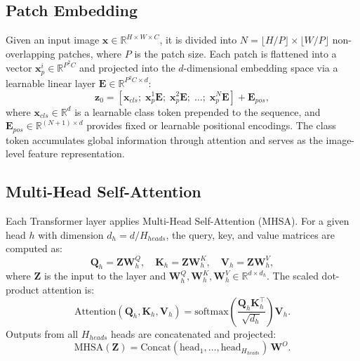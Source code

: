 \documentclass[journal]{IEEEtran}
\begin{document}
\subsection{Patch Embedding}
Given an input image $\mathbf{x} \in \mathbb{R}^{H \times W \times C}$, it is divided into
$N = \lfloor H/P \rfloor \times \lfloor W/P \rfloor$ non-overlapping patches, where $P$ is
the patch size. Each patch is flattened into a vector $\mathbf{x}_p^i \in \mathbb{R}^{P^2 C}$
and projected into the $d$-dimensional embedding space via a learnable linear layer
$\mathbf{E} \in \mathbb{R}^{P^2C \times d}$:
\begin{equation}
    \mathbf{z}_0 = [\mathbf{x}_{cls};\; \mathbf{x}_p^1\mathbf{E};\; \mathbf{x}_p^2\mathbf{E};\;
    \ldots;\; \mathbf{x}_p^N\mathbf{E}] + \mathbf{E}_{pos},
    \label{eq:patch_embed}
\end{equation}
where $\mathbf{x}_{cls} \in \mathbb{R}^d$ is a learnable class token prepended to the sequence,
and $\mathbf{E}_{pos} \in \mathbb{R}^{(N+1) \times d}$ provides fixed or learnable positional
encodings. The class token accumulates global information through attention and serves as the
image-level feature representation.

\subsection{Multi-Head Self-Attention}
Each Transformer layer applies Multi-Head Self-Attention (MHSA). For a given head $h$ with
dimension $d_h = d / H_{heads}$, the query, key, and value matrices are computed as:
\begin{equation}
    \mathbf{Q}_h = \mathbf{Z}\mathbf{W}_h^Q,\quad
    \mathbf{K}_h = \mathbf{Z}\mathbf{W}_h^K,\quad
    \mathbf{V}_h = \mathbf{Z}\mathbf{W}_h^V,
\end{equation}
where $\mathbf{Z}$ is the input to the layer and
$\mathbf{W}_h^Q, \mathbf{W}_h^K, \mathbf{W}_h^V \in \mathbb{R}^{d \times d_h}$.
The scaled dot-product attention is:
\begin{equation}
    \text{Attention}(\mathbf{Q}_h, \mathbf{K}_h, \mathbf{V}_h) =
    \text{softmax}\!\left(\frac{\mathbf{Q}_h \mathbf{K}_h^\top}{\sqrt{d_h}}\right)\mathbf{V}_h.
    \label{eq:attention}
\end{equation}
Outputs from all $H_{heads}$ heads are concatenated and projected:
\begin{equation}
    \text{MHSA}(\mathbf{Z}) = \text{Concat}(\text{head}_1,\ldots,\text{head}_{H_{heads}})\,\mathbf{W}^O.
\end{equation}
\end{document}

